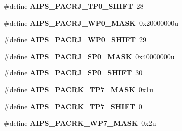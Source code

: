 \begin{DoxyCompactItemize}
\item 
\#define {\bfseries A\+I\+P\+S\+\_\+\+P\+A\+C\+R\+J\+\_\+\+T\+P0\+\_\+\+S\+H\+I\+FT}~28\hypertarget{group__AIPS__Register__Masks_ga4001b95beeda1f751216082bf3bbd981}{}\label{group__AIPS__Register__Masks_ga4001b95beeda1f751216082bf3bbd981}

\item 
\#define {\bfseries A\+I\+P\+S\+\_\+\+P\+A\+C\+R\+J\+\_\+\+W\+P0\+\_\+\+M\+A\+SK}~0x20000000u\hypertarget{group__AIPS__Register__Masks_ga17da301df0d9857525b7cf277100c03e}{}\label{group__AIPS__Register__Masks_ga17da301df0d9857525b7cf277100c03e}

\item 
\#define {\bfseries A\+I\+P\+S\+\_\+\+P\+A\+C\+R\+J\+\_\+\+W\+P0\+\_\+\+S\+H\+I\+FT}~29\hypertarget{group__AIPS__Register__Masks_ga8afcdeaeb9b8e821b6b4eb89caa02af4}{}\label{group__AIPS__Register__Masks_ga8afcdeaeb9b8e821b6b4eb89caa02af4}

\item 
\#define {\bfseries A\+I\+P\+S\+\_\+\+P\+A\+C\+R\+J\+\_\+\+S\+P0\+\_\+\+M\+A\+SK}~0x40000000u\hypertarget{group__AIPS__Register__Masks_ga664f29205468e6749a47af7bd545d08f}{}\label{group__AIPS__Register__Masks_ga664f29205468e6749a47af7bd545d08f}

\item 
\#define {\bfseries A\+I\+P\+S\+\_\+\+P\+A\+C\+R\+J\+\_\+\+S\+P0\+\_\+\+S\+H\+I\+FT}~30\hypertarget{group__AIPS__Register__Masks_ga57c9252b7528b84030d20ba75ecc2ef6}{}\label{group__AIPS__Register__Masks_ga57c9252b7528b84030d20ba75ecc2ef6}

\item 
\#define {\bfseries A\+I\+P\+S\+\_\+\+P\+A\+C\+R\+K\+\_\+\+T\+P7\+\_\+\+M\+A\+SK}~0x1u\hypertarget{group__AIPS__Register__Masks_ga15885b46fbd0c0efcc75fb7860aa135c}{}\label{group__AIPS__Register__Masks_ga15885b46fbd0c0efcc75fb7860aa135c}

\item 
\#define {\bfseries A\+I\+P\+S\+\_\+\+P\+A\+C\+R\+K\+\_\+\+T\+P7\+\_\+\+S\+H\+I\+FT}~0\hypertarget{group__AIPS__Register__Masks_ga00fb08763e8a85d9446f9bc4a49999d7}{}\label{group__AIPS__Register__Masks_ga00fb08763e8a85d9446f9bc4a49999d7}

\item 
\#define {\bfseries A\+I\+P\+S\+\_\+\+P\+A\+C\+R\+K\+\_\+\+W\+P7\+\_\+\+M\+A\+SK}~0x2u\hypertarget{group__AIPS__Register__Masks_ga5059b2dfaaa78821e989bbc596dc0dc9}{}\label{group__AIPS__Register__Masks_ga5059b2dfaaa78821e989bbc596dc0dc9}


\end{DoxyCompactItemize}
